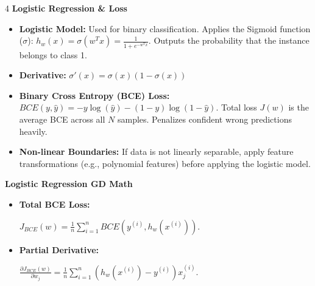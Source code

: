 \documentclass[8pt,landscape,a4paper]{extarticle}
\begin{document}
\begin{multicols*}{4}
\noindent\textbf{Logistic Regression \& Loss}
\begin{itemize}[leftmargin=*, nosep]
    \item \textbf{Logistic Model:} Used for binary classification. Applies the Sigmoid function ($\sigma$): $h_w(x) = \sigma(w^T x) = \frac{1}{1 + e^{-w^Tx}}$. Outputs the probability that the instance belongs to class 1.
    \item \textbf{Derivative:} $\sigma'(x) = \sigma(x)(1 - \sigma(x))$
    \item \textbf{Binary Cross Entropy (BCE) Loss:} $BCE(y, \hat{y}) = -y \log(\hat{y}) - (1-y)\log(1-\hat{y})$. Total loss $J(w)$ is the average BCE across all $N$ samples. Penalizes confident wrong predictions heavily.
    \item \textbf{Non-linear Boundaries:} If data is not linearly separable, apply feature transformations (e.g., polynomial features) before applying the logistic model.
\end{itemize}

\vspace{1mm}
\noindent\textbf{Logistic Regression GD Math}
\begin{itemize}[leftmargin=*, nosep]
    \item \textbf{Total BCE Loss:} 

    $J_{BCE}(w) = \frac{1}{n} \sum_{i=1}^n BCE(y^{(i)}, h_w(x^{(i)}))$.
    \item \textbf{Partial Derivative:} 
    
    $\frac{\partial J_{BCE}(w)}{\partial w_j} = \frac{1}{n} \sum_{i=1}^n (h_w(x^{(i)}) - y^{(i)}) x_j^{(i)}$.
\end{itemize}


\end{multicols*}
\end{document}
